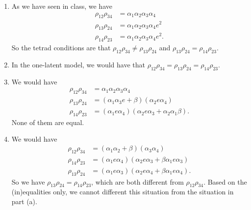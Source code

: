 \documentclass{article}
\begin{document}
\begin{ex}
\begin{enumerate}
\item As we have seen in class, we have
\begin{align*}
\rho_{12}\rho_{34}
  & = 
\alpha_1\alpha_2\alpha_3\alpha_4
  \\
\rho_{13}\rho_{24}
  & =
\alpha_1\alpha_2\alpha_3\alpha_4e^2
  \\
\rho_{14}\rho_{23}
  & =
\alpha_1\alpha_2\alpha_3\alpha_4e^2.
\end{align*}
So the tetrad conditions are that $\rho_{12}\rho_{34}\neq\rho_{13}\rho_{24}$ and
$\rho_{13}\rho_{24}=\rho_{14}\rho_{23}$. 
\item In the one-latent model, we would have that
$\rho_{12}\rho_{34}=\rho_{13}\rho_{24}=\rho_{14}\rho_{23}$.
\item We would have 
\begin{align*}
\rho_{12}\rho_{34}
  & = 
\alpha_1\alpha_2\alpha_3\alpha_4
  \\
\rho_{13}\rho_{24}
  & =
(\alpha_1\alpha_3e+\beta)(\alpha_2e\alpha_4)
  \\
\rho_{14}\rho_{23}
  & =
(\alpha_1e\alpha_4)(\alpha_2 e\alpha_3+\alpha_2\alpha_1\beta).
\end{align*}
None of them are equal.
\item We would have 
\begin{align*}
\rho_{12}\rho_{34}
  & =
(\alpha_1\alpha_2+\beta)(\alpha_3\alpha_4)
  \\
\rho_{14}\rho_{23}
  & =
(\alpha_1e\alpha_4)(\alpha_2e\alpha_3+\beta\alpha_1e\alpha_3)
  \\
\rho_{13}\rho_{24}
  & =
(\alpha_1e\alpha_3)(\alpha_2e\alpha_4+\beta\alpha_1e\alpha_4).
\end{align*}
So we have $\rho_{13}\rho_{24}=\rho_{14}\rho_{23}$, which are both different
from $\rho_{12}\rho_{34}$. Based on the (in)equalities only, we cannot different
this situation from the situation in part (a).
\end{enumerate}
\end{ex}
\end{document}
